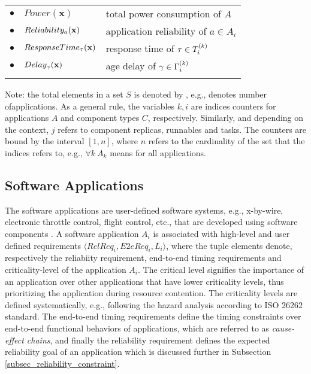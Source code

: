 \begin{table}[]
\begin{tabular}{@{}llp{}@{}}
$\bullet$ & $Power(\textbf{x})$                & total power consumption of  $A$    \\
$\bullet$ & $Reliability_{a}(\textbf{x})$      & application reliability  of $a\in A_i$              \\
$\bullet$ & $ResponseTime_{\tau}(\textbf{x})$     & response time of  $\tau \in \sss{T}$                       \\
$\bullet$ & $Delay_{\gamma}(\textbf{x})$            & age delay of $\gamma \in \sss{\Gamma} $         \\
\bottomrule\\
\end{tabular}
{\footnotesize Note: the total elements in a set $S$ is denoted by , e.g.,  denotes number ofapplications. As a general rule, the variables $k,i$ are indices counters for applications $A$ and component types $C$, respectively. Similarly, and depending on the context, $j$ refers to component replicas, runnables and tasks. The counters are bound by the interval $[1,n]$, where $n$ refers to the cardinality of the set that the indices refers to, e.g., $\forall k\ A_k$ means for all applications.} 
\end{table}

\subsection{Software Applications}
The software applications are user-defined software systems, e.g., x-by-wire, electronic throttle control, flight control, etc., that are developed using software components \cite{softwarecomponents}\cite{Crnkovic2002BuildingSystems}. A software application $A_i$ is associated with high-level and user defined requirements $\langle RelReq_i, E2eReq_i,L_i\rangle$, where the tuple elements denote, respectively the reliabiity requirement, end-to-end timing requirements and criticality-level of the application $A_i$. The critical level signifies the importance of an application over other applications that have lower criticality levels, thus prioritizing the application during resource contention. The criticality levels are defined systematically, e.g., following the hazard analysis according to ISO 26262 standard. The end-to-end timing requirements define the timing constraints over end-to-end functional behaviors of applications, which are referred to as \textit{cause-effect chains}, and finally the reliability requirement defines the expected reliability goal of an application which is discussed further in Subsection \ref{subsec_reliability_constraint}. 

